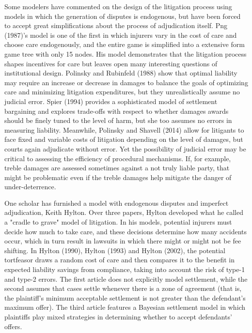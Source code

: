 \documentclass{article}
\begin{document}
Some modelers have commented on the design of the litigation process using models in which the generation of disputes is endogenous, but have been forced to accept great simplifications about the process of adjudication itself. Png (1987)'s model is one of the first in which injurers vary in the cost of care and choose care endogenously, and the entire game is simplified into a extensive form game tree with only 15 nodes. His model demonstrates that the litigation process shapes incentives for care but leaves open many interesting questions of institutional design. Polinsky and Rubinfeld (1988) show that optimal liability may require an increase or decrease in damages to balance the goals of optimizing care and minimizing litigation expenditures, but they unrealistically assume no judicial error. Spier (1994) provides a sophisticated model of settlement bargaining and explores trade-offs with respect to whether damages awards should be finely tuned to the level of harm, but she too assumes no errors in measuring liability. Meanwhile, Polinsky and Shavell (2014) allow for litigants to face fixed and variable costs of litigation depending on the level of damages, but courts again adjudicate without error. Yet the possibility of judicial error may be critical to assessing the efficiency of procedural mechanisms. If, for example, treble damages are assessed sometimes against a not truly liable party, that might be problematic even if the treble damages help mitigate the danger of under-deterrence. 

One scholar has furnished a model with endogenous disputes and imperfect adjudication, Keith Hylton. Over three papers, Hylton developed what he called a "cradle to grave" model of litigation. In his models, potential injurers must decide how much to take care, and these decisions determine how many accidents occur, which in turn result in lawsuits in which there might or might not be fee shifting. In Hylton (1990), Hylton (1993) and Hylton (2002), the potential tortfeasor draws a random cost of care and then compares it to the benefit in expected liability savings from compliance, taking into account the risk of type-1 and type-2 errors. The first article does not explicitly model settlement, while the second assumes that cases settle whenever there is a zone of agreement (that is, the plaintiff's minimum acceptable settlement is not greater than the defendant's maximum offer). The third article features a Bayesian settlement model in which plaintiffs play mixed strategies in determining whether to accept defendants' offers.  
\end{document}
